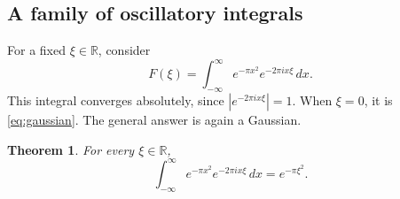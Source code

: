 \documentclass[11pt]{article}
\theoremstyle{plain}
\newtheorem{theorem}{Theorem}[section]
\theoremstyle{definition}
\theoremstyle{remark}
\numberwithin{equation}{section}
\newcommand{\R}{\mathbb{R}}
\begin{document}
\subsection{A family of oscillatory integrals}
For a fixed $\xi\in\R$, consider
\[
 F(\xi)=\int_{-\infty}^{\infty}e^{-\pi x^2}e^{-2\pi i x\xi}\,dx.
\]
This integral converges absolutely, since $|e^{-2\pi i x\xi}|=1$.
When $\xi=0$, it is \eqref{eq:gaussian}. The general answer is again a
Gaussian.
\begin{theorem}\label{thm:fourier-gaussian}
For every $\xi\in\R$,
\begin{equation}\label{eq:fourier-gaussian}
 \boxed{\displaystyle
 \int_{-\infty}^{\infty}e^{-\pi x^2}e^{-2\pi i x\xi}\,dx
 =e^{-\pi\xi^2}.}
\end{equation}
\end{theorem}


\end{document}
